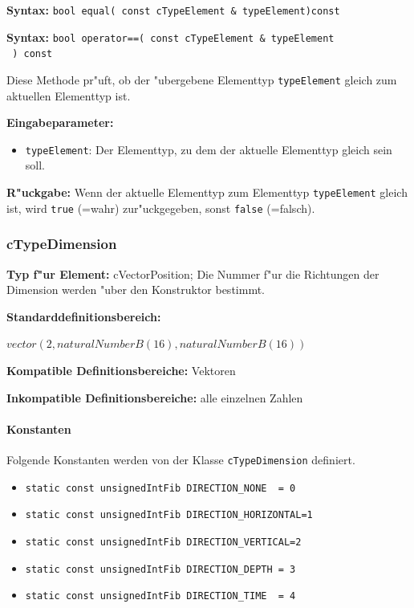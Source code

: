 \textbf{Syntax:} \verb|bool equal( const cTypeElement & typeElement)const|

\noindent
\textbf{Syntax:} \verb|bool operator==( const cTypeElement & typeElement| \\\verb| ) const|

\bigskip\noindent
Diese Methode pr"uft, ob der "ubergebene Elementtyp \verb|typeElement| gleich zum aktuellen Elementtyp ist.

\bigskip\noindent
\textbf{Eingabeparameter:}
\begin{itemize}
 \item \verb|typeElement|: Der Elementtyp, zu dem der aktuelle Elementtyp gleich sein soll.
\end{itemize}

\bigskip\noindent
\textbf{R"uckgabe:} Wenn der aktuelle Elementtyp zum Elementtyp \verb|typeElement| gleich ist, wird \verb|true| (=wahr) zur"uckgegeben, sonst \verb|false| (=falsch).



\subsubsection{cTypeDimension}

\textbf{Typ f"ur Element:} cVectorPosition; Die Nummer f"ur die Richtungen der Dimension werden "uber den Konstruktor bestimmt.

\bigskip\noindent
\textbf{Standarddefinitionsbereich:}

$vector( 2 , naturalNumberB(16), naturalNumberB(16) )$

\bigskip\noindent
\textbf{Kompatible Definitionsbereiche:} Vektoren

\bigskip\noindent
\textbf{Inkompatible Definitionsbereiche:} alle einzelnen Zahlen


\paragraph{Konstanten}

Folgende Konstanten werden von der Klasse \verb|cTypeDimension| definiert.

\begin{itemize}
 \item \verb|static const unsignedIntFib DIRECTION_NONE  = 0|
 \item \verb|static const unsignedIntFib DIRECTION_HORIZONTAL=1|
 \item \verb|static const unsignedIntFib DIRECTION_VERTICAL=2|
 \item \verb|static const unsignedIntFib DIRECTION_DEPTH = 3|
 \item \verb|static const unsignedIntFib DIRECTION_TIME  = 4|
\end{itemize}


